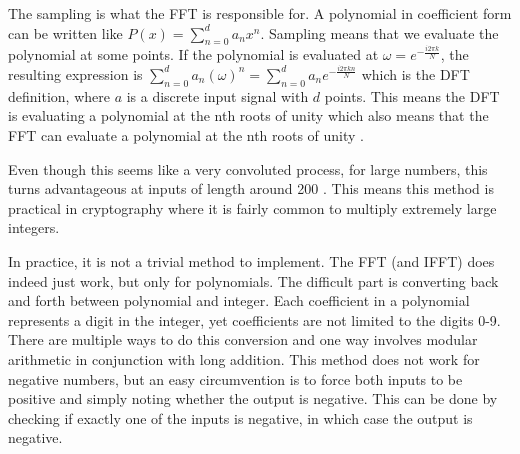 The sampling is what the FFT is responsible for. A polynomial in coefficient form can be written like $P(x) = \sum^d_{n=0} a_nx^n$. Sampling means that we evaluate the polynomial at some points. If the polynomial is evaluated at $\omega = e^{-\frac{i2\pi k}{N}}$, the resulting expression is $\sum^d_{n=0} a_n(\omega)^n = \sum^d_{n=0} a_ne^{-\frac{i2\pi k n}{N}}$ which is the DFT definition, where $a$ is a discrete input signal with $d$ points. This means the DFT is evaluating a polynomial at the nth roots of unity which also means that the FFT can evaluate a polynomial at the nth roots of unity \cite{Emerencia2007}.

Even though this seems like a very convoluted process, for large numbers, this turns advantageous at inputs of length around 200 \cite{Emerencia2007}. This means this method is practical in cryptography where it is fairly common to multiply extremely large integers. 

In practice, it is not a trivial method to implement. The FFT (and IFFT) does indeed just work, but only for polynomials. The difficult part is converting back and forth between polynomial and integer. Each coefficient in a polynomial represents a digit in the integer, yet coefficients are not limited to the digits 0-9. There are multiple ways to do this conversion and one way involves modular arithmetic in conjunction with long addition. This method does not work for negative numbers, but an easy circumvention is to force both inputs to be positive and simply noting whether the output is negative. This can be done by checking if exactly one of the inputs is negative, in which case the output is negative.





